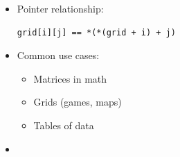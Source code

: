 \documentclass[10pt]{article}
\begin{document}
\begin{itemize}
	\item Pointer relationship:
	\begin{verbatim}
grid[i][j] == *(*(grid + i) + j)
	\end{verbatim}

	\item Common use cases:
	\begin{itemize}
		\item Matrices in math
		\item Grids (games, maps)
		\item Tables of data
	\end{itemize}

\item {}
\end{itemize}

\newpage
\end{document}
